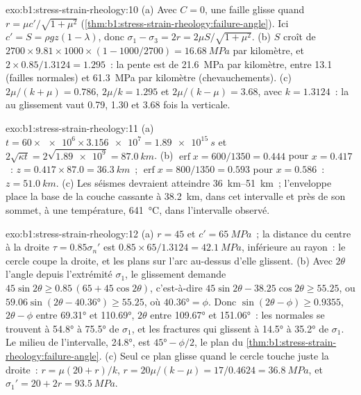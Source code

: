\begin{solution}{exo:b1:stress-strain-rheology:10}
(a) Avec $C = 0$, une faille glisse quand $r = \mu c'/\sqrt{1+\mu^2}$
(\cref{thm:b1:stress-strain-rheology:failure-angle}). Ici $c' = S =
\rho g z(1-\lambda)$, donc $\sigma_1 - \sigma_3 = 2r = 2\mu S/\sqrt{1+\mu^2}$.
(b) $S$ croît de $2700\times9.81\times1000\times(1 - 1000/2700) =
\qty{16.68}{MPa}$ par kilomètre, et $2\times0.85/1.3124 = 1.295$~: la pente
est de \qty{21.6}{MPa} par kilomètre, entre \num{13.1} (failles normales) et
\qty{61.3}{MPa} par kilomètre (chevauchements). (c) $2\mu/(k+\mu) = 0.786$,
$2\mu/k = 1.295$ et $2\mu/(k-\mu) = 3.68$, avec $k = 1.3124$~: la
 au glissement vaut 0.79, 1.30 et 3.68 fois la  verticale.
\end{solution}

\begin{solution}{exo:b1:stress-strain-rheology:11}
(a) $t = 60\times\num{e6}\times\num{3.156e7} = \qty{1.89e15}{s}$ et
$2\sqrt{\kappa t} = 2\sqrt{\num{1.89e9}} = \qty{87.0}{km}$. (b)
$\operatorname{erf}x = 600/1350 = 0.444$ pour $x = 0.417$~: $z = 0.417\times87.0
= \qty{36.3}{km}$~; $\operatorname{erf}x = 800/1350 = 0.593$ pour $x = 0.586$~:
$z = \qty{51.0}{km}$. (c) Les séismes devraient atteindre \qtyrange{36}{51}{km}~;
l'enveloppe place la base de la couche cassante à \qty{38.2}{km}, dans
cet intervalle et près de son sommet, à une température, \qty{641}{\degreeCelsius}, dans
l'intervalle observé.
\end{solution}

\begin{solution}{exo:b1:stress-strain-rheology:12}
(a) $r = 45$ et $c' = \qty{65}{MPa}$~; la distance du centre à la droite
$\tau = 0.85\sigma_n'$ est $0.85\times65/1.3124 = \qty{42.1}{MPa}$, inférieure au
rayon~: le cercle coupe la droite, et les plans sur l'arc au-dessus d'elle
glissent. (b) Avec $2\theta$ l'angle depuis l'extrémité $\sigma_1$, le glissement demande
$45\sin2\theta \ge 0.85\,(65 + 45\cos2\theta)$, c'est-à-dire
$45\sin2\theta - 38.25\cos2\theta \ge 55.25$, ou
$59.06\sin(2\theta - \ang{40.36}) \ge 55.25$, où $\ang{40.36} = \phi$.
Donc $\sin(2\theta - \phi) \ge 0.9355$, $2\theta - \phi$ entre \ang{69.31}
et \ang{110.69}, $2\theta$ entre \ang{109.67} et \ang{151.06}~: les normales
se trouvent à \ang{54.8} à \ang{75.5} de $\sigma_1$, et les fractures qui glissent
à \ang{14.5} à \ang{35.2} de $\sigma_1$. Le milieu de l'intervalle,
\ang{24.8}, est $\ang{45} - \phi/2$, le plan du
\cref{thm:b1:stress-strain-rheology:failure-angle}. (c) Seul ce plan glisse
quand le cercle touche juste la droite~: $r = \mu(20 + r)/k$, $r = 20\mu/(k -
\mu) = 17/0.4624 = \qty{36.8}{MPa}$, et $\sigma_1' = 20 + 2r =
\qty{93.5}{MPa}$.
\end{solution}

